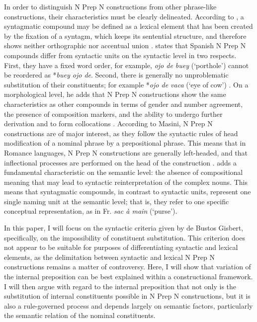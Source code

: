 \documentclass[output=paper]{langsci/langscibook}
\begin{document}
In order to distinguish N Prep N constructions from other phrase-like constructions, their characteristics must be clearly delineated. According to \citet{BuenafuentesdelaMata:2010}, a syntagmatic compound may be defined as a lexical element that has been created by the fixation of a syntagm, which keeps its sentential structure, and therefore shows neither orthographic nor accentual union \citep[21ff.]{BuenafuentesdelaMata:2010}.  states that Spanish N Prep N compounds differ from syntactic units on the syntactic level in two respects. First, they have a fixed word order, for example, \textit{ojo de buey} (`porthole') cannot be reordered as *\textit {buey ojo de}. Second, there is generally no unproblematic substitution of their constituents; for example *\textit{ojo de vaca} (`eye of cow') \citep[4825]{ValAlvaro:1999}. On a morphological level, he adds that N Prep N constructions show the same characteristics as other compounds in terms of gender and number agreement, the presence of composition markers, and the ability to undergo further derivation and to form collocations \citep[77]{BustosGisbert:1986}. According to Masini, N Prep N constructions are of major interest, as they follow the syntactic rules of head modification of a nominal phrase by a prepositional phrase. This means that in Romance languages, N Prep N constructions are generally left-headed, and that inflectional processes are performed on the head of the construction \citep[257]{Masini:2009}. \citet[4827]{ValAlvaro:1999} adds a fundamental characteristic on the semantic level: the absence of compositional meaning that may lead to syntactic reinterpretation of the complex nouns. This means that syntagmatic compounds, in contrast to syntactic units, represent one single naming unit at the semantic level; that is, they refer to one specific conceptual representation, as in Fr. \textit{sac à main} (`purse').

In this paper, I will focus on the syntactic criteria given by de Bustos Gisbert, specifically, on the impossibility of constituent substitution. This criterion does not appear to be suitable for purposes of differentiating syntactic and lexical elements, as the delimitation between syntactic and lexical N Prep N constructions remains a matter of controversy. Here, I will show that variation of the internal preposition can be best explained within a constructional framework. I will then argue with regard to the internal preposition that not only is the substitution of internal constituents possible in N Prep N constructions, but it is also a rule-governed process and depends largely on semantic factors, particularly the semantic relation of the nominal constituents.
\end{document}

